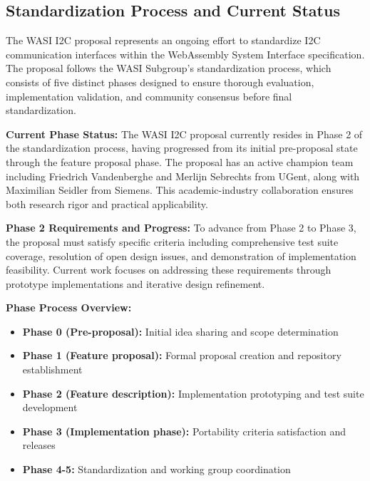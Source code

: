 \subsection{Standardization Process and Current Status}
\label{subsec:i2c-standardization-process}

The WASI I2C proposal represents an ongoing effort to standardize I2C communication interfaces within the WebAssembly System Interface specification\cite{wasi_i2c_proposal}. The proposal follows the WASI Subgroup's standardization process, which consists of five distinct phases designed to ensure thorough evaluation, implementation validation, and community consensus before final standardization.


\textbf{Current Phase Status:} The WASI I2C proposal currently resides in Phase 2 of the standardization process, having progressed from its initial pre-proposal state through the feature proposal phase. The proposal has an active champion team including Friedrich Vandenberghe and Merlijn Sebrechts from UGent, along with Maximilian Seidler from Siemens. This academic-industry collaboration ensures both research rigor and practical applicability.

\textbf{Phase 2 Requirements and Progress:} To advance from Phase 2 to Phase 3, the proposal must satisfy specific criteria including comprehensive test suite coverage, resolution of open design issues, and demonstration of implementation feasibility. Current work focuses on addressing these requirements through prototype implementations and iterative design refinement.

\textbf{Phase Process Overview:}
\begin{itemize}
    \item \textbf{Phase 0 (Pre-proposal):} Initial idea sharing and scope determination
    \item \textbf{Phase 1 (Feature proposal):} Formal proposal creation and repository establishment  
    \item \textbf{Phase 2 (Feature description):} Implementation prototyping and test suite development
    \item \textbf{Phase 3 (Implementation phase):} Portability criteria satisfaction and releases
    \item \textbf{Phase 4-5:} Standardization and working group coordination
\end{itemize}

